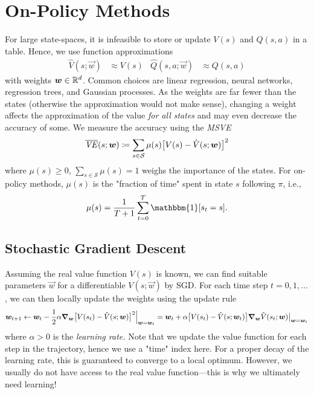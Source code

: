 	\section{On-Policy Methods}
		For large state-spaces, it is infeasible to store or update \(V(s)\) and \(Q(s, a)\) in a table. Hence, we use function approximations
		\begin{align}
			\hat{V}(s; \vec{w}) &\approx V(s) &
			\hat{Q}(s, a; \vec{w}) &\approx Q(s, a)
		\end{align}
		with weights \(\bm{w} \in \mathbb{R}^d\). Common choices are linear regression, neural networks, regression trees, and Gaussian processes. As the weights are far fewer than the states (otherwise the approximation would not make sense), changing a weight affects the approximation of the value \emph{for all states} and may even decrease the accuracy of some. We measure the accuracy using the \emph{\ac{MSVE}}
		\begin{equation}
			\overline{\mathit{VE}}(s; \bm{w}) \coloneqq \sum_{s \in \mathcal{S}} \mu(s) \bigl[ V(s) - \hat{V}(s; \bm{w}) \bigr]^2
		\end{equation}
		where \( \mu(s) \geq 0 \), \( \sum_{s \in \mathcal{S}} \mu(s) = 1 \) weighs the importance of the states. For on-policy methods, \(\mu(s)\) is the "fraction of time" spent in state \(s\) following \(\pi\), i.e.,
		\begin{equation}
			\mu(s) = \frac{1}{T + 1} \sum_{t = 0}^{T} \mathbbm{1}[s_t = s].
		\end{equation}

		\subsection{Stochastic Gradient Descent}
			Assuming the real value function \(V(s)\) is known, we can find suitable parameters \(\vec{w}\) for a differentiable \(V(s; \vec{w})\) by \ac{SGD}. For each time step \(t = 0, 1, \dots\), we can then locally update the weights using the update rule
			\begin{equation}
				\bm{w}_{t + 1}
					\gets \bm{w}_t - \frac{1}{2} \alpha \grad_{\bm{w}} \bigl[ V(s_t) - \hat{V}(s; \bm{w}) \bigr]^2 \Bigr\rvert_{\bm{w} = \bm{w}_t}
					= \bm{w}_t + \alpha \bigl[ V(s_t) - \hat{V}(s; \bm{w}_t) \bigr] \grad_{\bm{w}} \hat{V}(s_t; \bm{w}) \bigr\rvert_{\bm{w} = \bm{w}_t}
					\label{eq:sgdFuncApprox}
			\end{equation}
			where \(\alpha > 0\) is the \emph{learning rate.} Note that we update the value function for each step in the trajectory, hence we use a "time" index here. For a proper decay of the learning rate, this is guaranteed to converge to a local optimum. However, we usually do not have access to the real value function---this is why we ultimately need learning!

